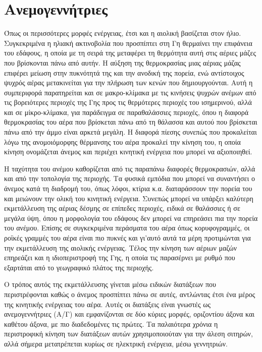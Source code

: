 \documentclass[12pt]{report}
\begin{document}
\section{Ανεμογεννήτριες}
Όπως οι περισσότερες μορφές ενέργειας, έτσι και η αιολική βασίζεται στον ήλιο. Συγκεκριμένα η ηλιακή ακτινοβολία που προσπίπτει στη Γη θερμαίνει την επιφάνεια του εδάφους, η οποία με τη σειρά της μεταφέρει τη θερμότητα αυτή 
στις αέριες μάζες που βρίσκονται πάνω από αυτήν. Η αύξηση της θερμοκρασίας μιας αέριας μάζας επιφέρει μείωση στην πυκνότητά της και την ανοδική της πορεία, ενώ αντίστοιχος ψυχρός αέρας μετακινείται για την πλήρωση των κενών
που δημιουργούνται. Αυτή η συμπεριφορά παρατηρείται και σε μακρο-κλίμακα με τις κινήσεις ψυχρών ανέμων από τις βορειότερες περιοχές της Γης προς τις θερμότερες περιοχές του ισημερινού, αλλά και σε μίκρο-κλίμακα, για παράδειγμα 
σε παραθαλάσσιες περιοχές, όπου η διαφορά θερμοκρασίας του αέρα που βρίσκεται πάνω από τη θάλασσα και αυτού που βρίσκεται πάνω από την άμμο είναι αρκετά μεγάλη. Η διαφορά πίεσης συνεπώς που προκαλείται λόγω της ανομοιόμορφης
θέρμανσης του αέρα προκαλεί την κίνηση του, η οποία κίνηση ονομάζεται άνεμος και περιέχει κινητική ενέργεια που μπορεί να αξιοποιηθεί.

Η ταχύτητα του ανέμου καθορίζεται από τις παραπάνω διαφορές θερμοκρασιών, αλλά και από την τοπολογία της περιοχής. Τα φυσικά εμπόδια που μπορεί να συναντήσει ο άνεμος κατά τη διαδρομή του, όπως λόφοι, κτίρια κ.α. διαταράσσουν την
πορεία του και μειώνουν την ολική του κινητική ενέργεια. Συνεπώς μπορεί να υπάρξει καλύτερη εκμετάλλευση της αέριας δέσμης σε επίπεδες περιοχές, ειδικά σε θαλάσσιες ή σε μεγάλα ύψη, όπου η μορφολογία του εδάφους δεν μπορεί να
επηρεάσει πια την πορεία του ανέμου. Επίσης σε συγκεκριμένα περάσματα του αέρα όπως κορυφογραμμές, οι ροϊκές γραμμές του αέρα είναι πιο πυκνές και γι'αυτό αυτά τα μέρη προτιμώνται για την εκμετάλλευση της αιολικής ενέργειας.
Τέλος την κίνηση των αέριων μαζών επηρεάζει και η ιδιοπεριστροφή της Γης, η οποία τις παρασέρνει με ρυθμό που εξαρτάται από το γεωγραφικό πλάτος της περιοχής.

Ο τρόπος αυτός της εκμετάλλευσης γίνεται μέσω ειδικών διατάξεων που περιστρέφονται καθώς ο άνεμος προσπίπτει πάνω σε αυτές, αντλώντας έτσι ένα μέρος της κινητικής ενέργειας του αέρα. Αυτές οι διατάξεις είναι γνωστές ως
ανεμογεννήτριες (Α/Γ) και εμφανίζονται σε δύο κύριες μορφές, οριζοντίου άξονα και καθέτου άξονα, με πιο διαδεδομένες τις πρώτες. Τα παλαιότερα χρόνια η περιστροφική κίνηση των διατάξεων αυτών χρησιμοποιούταν για την άλεση σιτηρών, 
αλλά σήμερα μετατρέπεται κυρίως σε ηλεκτρική ενέργεια, μέσω γεννητριών.
\end{document}
